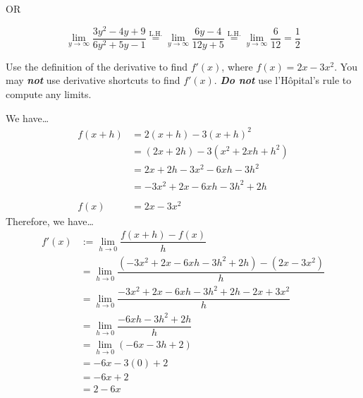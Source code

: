 \documentclass[12pt,letterpaper]{exam}
\newcommand{\lh}{\stackrel{\text{L.H.}}{=}}
\begin{document}
\begin{questions}
\begin{enumerate}[(a)]
	\phantom{.} \hfill OR \hfill \phantom{.} \par\vspace{0.3cm}
	
		\[
		\lim_{y \to \infty} \dfrac{3y^2 - 4y + 9}{6y^2 + 5y - 1} \lh \lim_{y \to \infty} \dfrac{6y - 4}{12y + 5} \lh \lim_{y \to \infty} \dfrac{6}{12}= \dfrac{1}{2}
		\]
	\end{enumerate}



\newpage
{} \par\vspace{0.3cm}

Use the definition of the derivative to find $f'(x)$, where $f(x)= 2x - 3x^2$. You may \textit{\textbf{not}} use derivative shortcuts to find $f'(x)$. \textit{\textbf{Do not}} use l'H\^opital's rule to compute any limits. \pspace

\tsol We have\dots
	\[
	\begin{aligned}
	f(x + h)&= 2(x + h) - 3(x + h)^2 \\
	\phantom{f(x + h)}&= (2x + 2h) - 3(x^2 + 2xh + h^2) \\
	\phantom{f(x + h)}&= 2x + 2h - 3x^2 - 6xh - 3h^2 \\
	\phantom{f(x + h)}&= -3x^2 + 2x - 6xh - 3h^2 + 2h \\
	\\
	f(x)&= 2x - 3x^2 
	\end{aligned}
	\] \pspace
Therefore, we have\dots
	\[
	\begin{aligned}
	f'(x)&:= \lim_{h \to 0} \dfrac{f(x + h) - f(x)}{h} \\[0.3cm]
	&= \lim_{h \to 0} \dfrac{(-3x^2 + 2x - 6xh - 3h^2 + 2h) - (2x - 3x^2)}{h} \\[0.3cm]
	&= \lim_{h \to 0} \dfrac{-3x^2 + 2x - 6xh - 3h^2 + 2h - 2x + 3x^2}{h} \\[0.3cm]
	&= \lim_{h \to 0} \dfrac{-6xh - 3h^2 + 2h}{h} \\[0.3cm]
	&= \lim_{h \to 0} (-6x - 3h + 2) \\[0.3cm]
	&= -6x - 3(0) + 2 \\[0.3cm]
	&= -6x + 2 \\[0.3cm]
	&= 2 - 6x
	\end{aligned}
	\]



\newpage
{} \par\vspace{0.3cm}


\end{questions}
\end{document}
